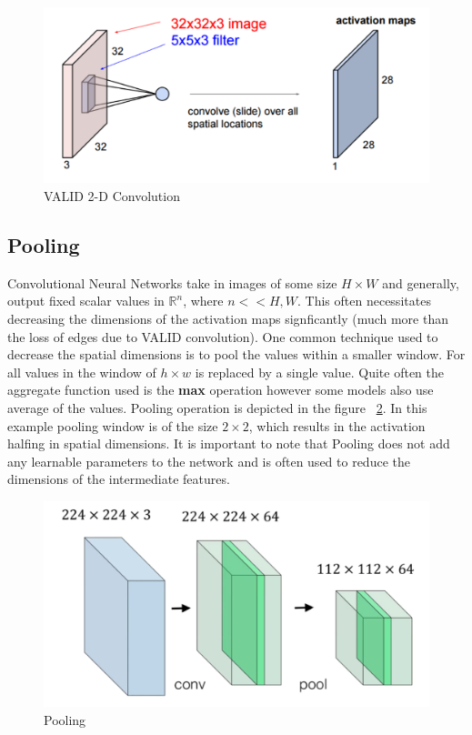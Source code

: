 \begin{figure}[H]
	\centering
   \includegraphics[scale=0.39]{figures/intro/cnn2d.png}
   \caption[2-D Convolution]{VALID 2-D Convolution}
   \label{fig:cnn2d}
\end{figure}

\subsection{Pooling}

Convolutional Neural Networks take in images of some size $H \times W$ and generally, output fixed scalar values in $\mathbb{R}^n$, where $n << H, W$. This often necessitates decreasing the dimensions of the activation maps signficantly (much more than the loss of edges due to VALID convolution). One common technique used to decrease the spatial dimensions is to pool the values within a smaller window. For all values in the window of $h \times w$ is replaced by a single value. Quite often the aggregate function used is the \textbf{max} operation however some models also use average of the values. Pooling operation is depicted in the figure ~\ref{fig:pool}. In this example pooling window is of the size $2\times2$, which results in the activation halfing in spatial dimensions. 
It is important to note that Pooling does not add any learnable parameters to the network and is often used to reduce the dimensions of the intermediate features.

\begin{figure}[H]
	\centering
   \includegraphics[scale=0.30]{figures/intro/pool.png}
   \caption[Pooling]{Pooling}
   \label{fig:pool}
\end{figure}


